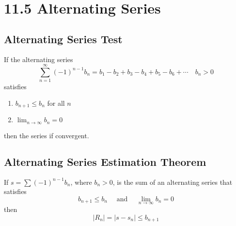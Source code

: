 %
%

\section*{11.5 Alternating Series}

\subsection*{Alternating Series Test}

If the alternating series
\[\sum_{n=1}^{\infty}{(-1)^{n-1}b_n} = b_1 - b_2 + b_3 - b_4 + b_5 - b_6
+ \cdots \quad b_n > 0\]
satisfies 
\begin{enumerate}
    \item \(b_{n+1} \leq b_n\) \quad for all \(n\)
    \item \(\lim_{n \to \infty}{b_n} = 0\)
\end{enumerate}
then the series if convergent.

\subsection*{Alternating Series Estimation Theorem}

If \(s = \sum{(-1)^{n-1}b_n}\), where \(b_n > 0\), is the sum of an alternating
series that satisfies
\[b_{n+1} \leq b_n \quad \text{ and } \quad \lim_{n \to \infty}{b_n} = 0\]
then
\[|R_n| = |s-s_n| \leq b_{n+1}\]
